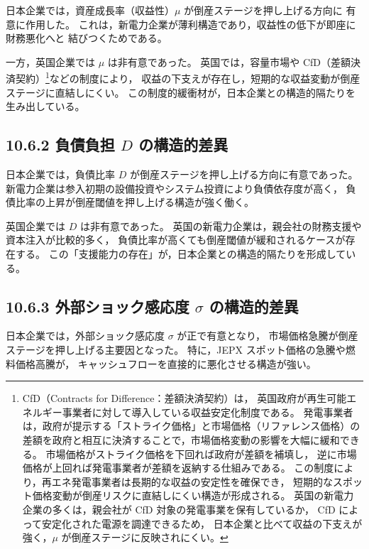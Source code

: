 日本企業では，資産成長率（収益性）$\mu$ が倒産ステージを押し上げる方向に
有意に作用した。
これは，新電力企業が薄利構造であり，収益性の低下が即座に財務悪化へと
結びつくためである。

一方，英国企業では $\mu$ は非有意であった。
英国では，容量市場や CfD（差額決済契約）\footnote{
CfD（Contracts for Difference：差額決済契約）は，
英国政府が再生可能エネルギー事業者に対して導入している収益安定化制度である。
発電事業者は，政府が提示する「ストライク価格」と市場価格（リファレンス価格）の
差額を政府と相互に決済することで，市場価格変動の影響を大幅に緩和できる。
市場価格がストライク価格を下回れば政府が差額を補填し，
逆に市場価格が上回れば発電事業者が差額を返納する仕組みである。
この制度により，再エネ発電事業者は長期的な収益の安定性を確保でき，
短期的なスポット価格変動が倒産リスクに直結しにくい構造が形成される。
英国の新電力企業の多くは，親会社が CfD 対象の発電事業を保有しているか，
CfD によって安定化された電源を調達できるため，
日本企業と比べて収益の下支えが強く，$\mu$ が倒産ステージに反映されにくい。}などの制度により，
収益の下支えが存在し，短期的な収益変動が倒産ステージに直結しにくい。
この制度的緩衝材が，日本企業との構造的隔たりを生み出している。

\subsection*{10.6.2 負債負担 $D$ の構造的差異}

日本企業では，負債比率 $D$ が倒産ステージを押し上げる方向に有意であった。
新電力企業は参入初期の設備投資やシステム投資により負債依存度が高く，
負債比率の上昇が倒産閾値を押し上げる構造が強く働く。

英国企業では $D$ は非有意であった。
英国の新電力企業は，親会社の財務支援や資本注入が比較的多く，
負債比率が高くても倒産閾値が緩和されるケースが存在する。
この「支援能力の存在」が，日本企業との構造的隔たりを形成している。

\subsection*{10.6.3 外部ショック感応度 $\sigma$ の構造的差異}

日本企業では，外部ショック感応度 $\sigma$ が正で有意となり，
市場価格急騰が倒産ステージを押し上げる主要因となった。
特に，JEPX スポット価格の急騰や燃料価格高騰が，
キャッシュフローを直接的に悪化させる構造が強い。

